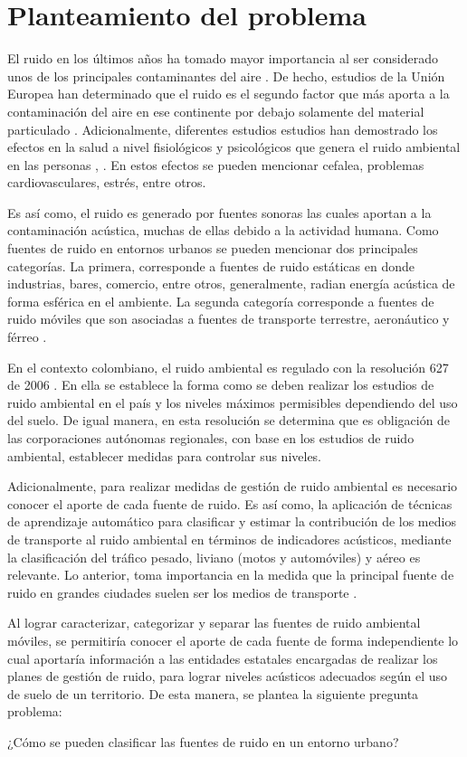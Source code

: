 \chapter{Planteamiento del problema}




El ruido en los últimos años ha tomado mayor importancia al ser considerado unos de los principales contaminantes del aire \cite{Murphy2014}. De hecho, estudios de la Unión Europea han determinado que el ruido es el segundo factor que más aporta a la contaminación del aire en ese continente por debajo solamente del material particulado \cite{EuropeanEnvironmentalAgency2014}. Adicionalmente, diferentes estudios estudios han demostrado los efectos en la salud a nivel fisiológicos y psicológicos que genera el ruido ambiental en las personas \cite{King2003}, \cite{Recio2016}. En estos efectos se pueden mencionar cefalea, problemas cardiovasculares, estrés, entre otros.

Es así como, el ruido es generado por fuentes sonoras las cuales aportan a la contaminación acústica, muchas de ellas debido a la actividad humana. Como fuentes de ruido en entornos urbanos se pueden mencionar dos principales categorías. La primera, corresponde a fuentes de ruido estáticas en donde industrias, bares, comercio, entre otros, generalmente, radian energía acústica de forma esférica en el ambiente. La segunda categoría corresponde a fuentes de ruido móviles que son asociadas a fuentes de transporte terrestre, aeronáutico y férreo \cite{Murphy2014}. 

En el contexto colombiano, el ruido ambiental es regulado con la resolución 627 de 2006 \cite{Ministeriodeambienteviviendaydesarrolloterritorial2006}. En ella se establece la forma como se deben realizar los estudios de ruido ambiental en el país y los niveles máximos permisibles dependiendo del uso del suelo. De igual manera, en esta resolución se determina que es obligación de las corporaciones autónomas regionales, con base en los estudios de ruido ambiental, establecer medidas para controlar sus niveles.

Adicionalmente, para realizar medidas de gestión de ruido ambiental es necesario conocer el aporte de cada fuente de ruido. Es así como, la aplicación de técnicas de aprendizaje automático para clasificar y estimar la contribución de los medios de transporte al ruido ambiental en términos de indicadores acústicos, mediante la clasificación del tráfico pesado, liviano (motos y automóviles) y aéreo es relevante. Lo anterior, toma importancia en la medida que la principal fuente de ruido en grandes ciudades suelen ser los medios de transporte \cite{omidvari2009effects}. 

Al lograr caracterizar, categorizar y separar las fuentes de ruido ambiental móviles, se permitiría conocer el aporte de cada fuente de forma independiente lo cual aportaría información a las entidades estatales encargadas de realizar los planes de gestión de ruido, para lograr niveles acústicos adecuados según el uso de suelo de un territorio. De esta manera, se plantea la siguiente pregunta problema:

¿Cómo se pueden clasificar las fuentes de ruido en un entorno urbano?
